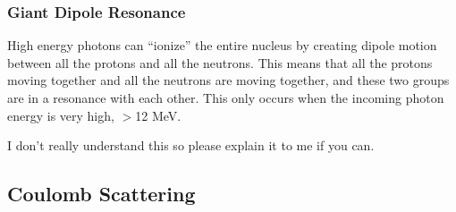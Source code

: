 \documentclass[letter]{article}
\begin{document}
\subsubsection{Giant Dipole Resonance}
High energy photons can ``ionize'' the entire nucleus by
  creating dipole motion between all the protons and all the
  neutrons. This means that all the protons moving together and all
  the neutrons are moving together, and these two groups are in a
  resonance with each other. This only occurs when the incoming photon energy is very
  high, $>$12 MeV.~\cite[Lec 25]{lecture}

I don't really understand this so please explain it to me if you can.

\subsection{Coulomb Scattering}
\end{document}
